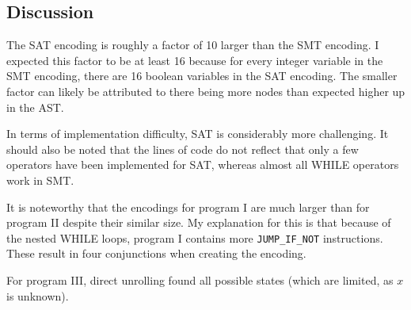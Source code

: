 \documentclass[sigconf,natbib=false]{acmart}
\begin{document}
\subsection{Discussion}
The SAT encoding is roughly a factor of 10 larger than the SMT encoding. I expected this factor to be at least 16 because for every integer variable in the SMT encoding, there are 16 boolean variables in the SAT encoding. The smaller factor can likely be attributed to there being more nodes than expected higher up in the AST.

In terms of implementation difficulty, SAT is considerably more challenging. It should also be noted that the lines of code do not reflect that only a few operators have been implemented for SAT, whereas almost all WHILE operators work in SMT.

It is noteworthy that the encodings for program I are much larger than for program II despite their similar size. My explanation for this is that because of the nested WHILE loops, program I contains more \texttt{JUMP\_IF\_NOT} instructions. These result in four conjunctions when creating the encoding.

For program III, direct unrolling found all possible states (which are limited, as \( x \) is unknown).

\printbibliography
\end{document}
